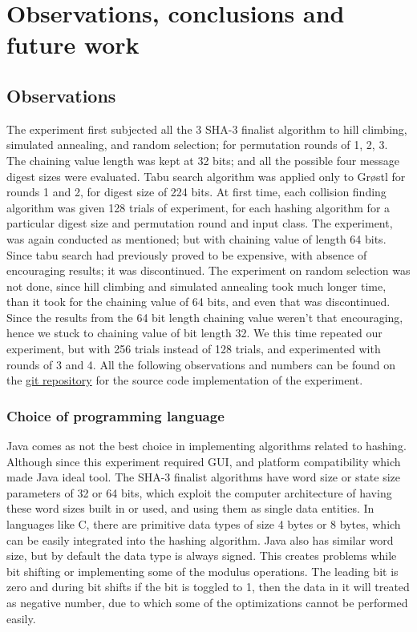 \chapter{Observations, conclusions and future work}

\section{Observations}
The experiment first subjected all the 3 SHA-3 finalist algorithm to hill climbing, simulated annealing, and
random selection; for permutation rounds of 1, 2, 3. The chaining value length was kept at 32 bits; and all
the possible four message digest sizes were evaluated. Tabu search algorithm was applied only to Gr{\o}stl
for rounds 1 and 2, for digest size of 224 bits. At first time, each collision finding algorithm was given
128 trials of experiment, for each hashing algorithm for a particular digest size and permutation round and
input class. The experiment, was again conducted as mentioned; but with chaining value of length 64 bits. Since
tabu search had previously proved to be expensive, with absence of encouraging results; it was discontinued.
The experiment on random selection was not done, since hill climbing and simulated annealing took much longer
time, than it took for the chaining value of 64 bits, and even that was discontinued. Since the results from
the 64 bit length chaining value weren't that encouraging, hence we stuck to chaining value of bit length 32.
We this time repeated our experiment, but with 256 trials instead of 128 trials, and experimented with rounds
of 3 and 4. All the following observations and numbers can be found on the 
\href{https://github.com/sxs9174/MSProjectCode/tree/master/MSProjectCode/Output}{git repository} for the source
code implementation of the experiment.

\subsection{Choice of programming language}

Java comes as not the best choice in implementing algorithms related to hashing. Although since this experiment 
required GUI, and platform compatibility which made Java ideal tool. The SHA-3 finalist algorithms have word size
or state size parameters of 32 or 64 bits, which exploit the computer architecture of having these word sizes
built in or used, and using them as single data entities. In languages like C, there are primitive data types
of size 4 bytes or 8 bytes, which can be easily integrated into the hashing algorithm. Java also has similar
word size, but by default the data type is always signed. This creates problems while bit shifting or implementing
some of the modulus operations. The leading bit is zero and during bit shifts if the bit is toggled to 1, then 
the data in it will treated as negative number, due to which some of the optimizations cannot be performed easily.

